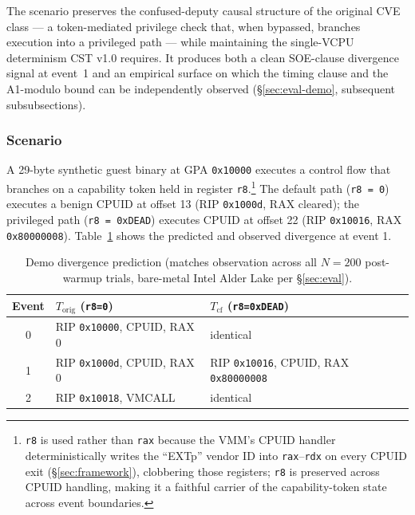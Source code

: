 \documentclass[conference]{IEEEtran}
\newcommand{\Korig}{T_\text{orig}}
\newcommand{\Tcf}{T_\text{cf}}
\begin{document}
The scenario preserves the confused-deputy causal structure of the
original CVE class --- a token-mediated privilege check that, when
bypassed, branches execution into a privileged path --- while
maintaining the single-VCPU determinism CST v1.0 requires. It
produces both a clean SOE-clause divergence signal at event~1 and
an empirical surface on which the timing clause and the A1-modulo
bound can be independently observed
(\S\ref{sec:eval-demo}, subsequent subsubsections).

\subsubsection{Scenario}

A 29-byte synthetic guest binary at GPA \texttt{0x10000} executes a
control flow that branches on a capability token held in register
\texttt{r8}.\footnote{\texttt{r8} is used rather than \texttt{rax}
because the VMM's CPUID handler deterministically writes the
``EXTp'' vendor ID into \texttt{rax}--\texttt{rdx} on every CPUID
exit (\S\ref{sec:framework}), clobbering those registers; \texttt{r8}
is preserved across CPUID handling, making it a faithful carrier of
the capability-token state across event boundaries.} The default
path (\texttt{r8 = 0}) executes a benign CPUID at offset 13
(RIP \texttt{0x1000d}, RAX cleared); the privileged path
(\texttt{r8 = 0xDEAD}) executes CPUID at offset 22
(RIP \texttt{0x10016}, RAX \texttt{0x80000008}).
Table~\ref{tab:demo-divergence} shows the predicted and observed
divergence at event 1.

\begin{table}[t]
  \caption{Demo divergence prediction (matches observation across
    all $N{=}200$ post-warmup trials, bare-metal Intel Alder Lake
    per \S\ref{sec:eval}).}
  \label{tab:demo-divergence}
  \centering
  \small
  \begin{tabular}{@{}cp{}p{}@{}}
  \toprule
  Event & $\Korig$ (\texttt{r8=0}) & $\Tcf$ (\texttt{r8=0xDEAD}) \\
  \midrule
  0 & RIP \texttt{0x10000}, CPUID, RAX 0    & identical \\
  1 & RIP \texttt{0x1000d}, CPUID, RAX 0    & RIP \texttt{0x10016}, CPUID, RAX \texttt{0x80000008} \\
  2 & RIP \texttt{0x10018}, VMCALL          & identical \\
  \bottomrule
  \end{tabular}
\end{table}
\end{document}
